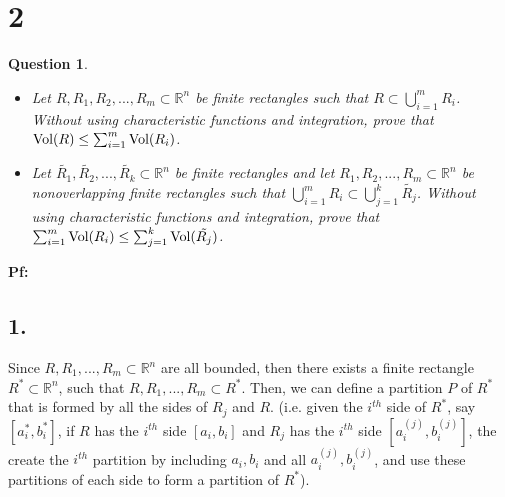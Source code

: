 \documentclass{article}
\newtheorem{question}{Question}
\begin{document}
\break

\section*{2}
\begin{myBox}[]{}
    \begin{question}

        \hfil

        \begin{itemize}
            \item[1.] Let $R,R_1,R_2,...,R_m\subset \mathbb{R}^n$ be finite rectangles such that $R\subset\bigcup_{i=1}^{m}R_i$. Without using characteristic functions and integration, prove that $\textmd{Vol}(R)\leq \sum_{i=1}^{m}\textmd{Vol}(R_i)$.
            \item[2.] Let $\tilde{R_1},\tilde{R_2},...,\tilde{R_k}\subset \mathbb{R}^n$ be finite rectangles and let $R_1,R_2,...,R_m\subset\mathbb{R}^n$ be nonoverlapping finite rectangles such that $\bigcup_{i=1}^{m}R_i\subset\bigcup_{j=1}^{k}\tilde{R_j}$. Without using characteristic functions and integration, prove that $\sum_{i=1}^{m}\textmd{Vol}(R_i)\leq\sum_{j=1}^{k}\textmd{Vol}(\tilde{R_j})$. 
        \end{itemize}
    \end{question}
\end{myBox}

\textbf{Pf:}
\subsection*{1.}
Since $R,R_1,...,R_m\subset\mathbb{R}^n$ are all bounded, then there exists a finite rectangle $R^*\subset\mathbb{R}^n$, such that $R,R_1,...,R_m\subset R^*$. Then, we can define a partition $P$ of $R^*$ that is formed by all the sides of $R_j$ and $R$. (i.e. given the $i^{th}$ side of $R^*$, say $[a_i^*,b_i^*]$, if $R$ has the $i^{th}$ side $[a_i,b_i]$ and $R_j$ has the $i^{th}$ side $[a_i^{(j)},b_i^{(j)}]$, the create the $i^{th}$ partition by including $a_i,b_i$ and all $a_i^{(j)},b_i^{(j)}$, and use these partitions of each side to form a partition of $R^*$).
\end{document}
